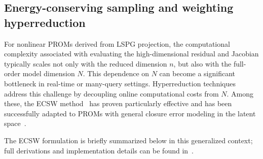 \documentclass[preprint,10pt]{elsarticle}
\begin{document}
\subsection{Energy-conserving sampling and weighting hyperreduction}
\label{subsec:ecsw_summary}

For nonlinear PROMs derived from LSPG projection, the computational complexity associated with evaluating the high-dimensional residual and Jacobian typically scales not only with the reduced dimension $n$, but also with the full-order model dimension $N$. This dependence on $N$ can become a significant bottleneck in real-time or many-query settings. Hyperreduction techniques address this challenge by decoupling online computational costs from $N$. Among these, the ECSW method~\cite{farhat2015structure} has proven particularly effective and has been successfully adapted to PROMs with general closure error modeling in the latent space~\cite{barnett2023neural}. 

The ECSW formulation is briefly summarized below in this generalized context; full derivations and implementation details can be found in~\cite{farhat2015structure,barnett2023neural}.
\end{document}
